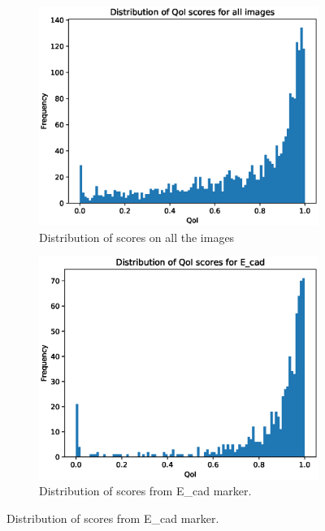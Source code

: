 \begin{figure}[ht!]
\centering
\begin{subfigure}{.5\textwidth}
  \centering
  \includegraphics[scale=0.37]{img/SPIE/all_probs_smote_pca.eps}
  \caption{Distribution of scores on all the images}
  \label{fig:all_probs}
\end{subfigure}%
\begin{subfigure}{.5\textwidth}
  \centering
  \includegraphics[scale=0.37]{img/SPIE/E_cad_probs_smote_pca.eps}
  \caption{Distribution of scores from E\_cad marker.}
  \label{fig:ecad_probs}
\end{subfigure}

\end{figure}
